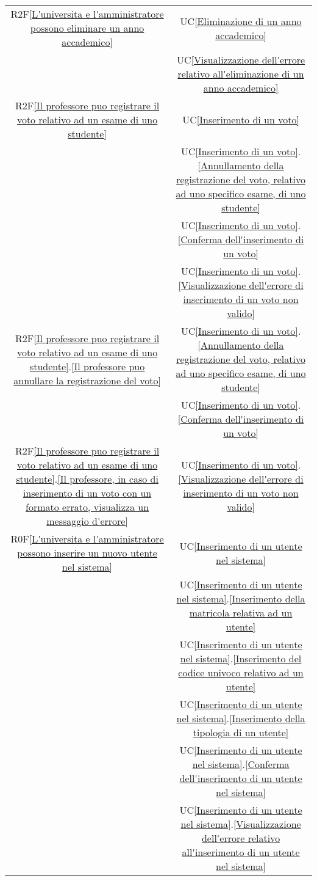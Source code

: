 \begin{longtable}{|c|c|}
\hline
R2F\ref{L'universita e l'amministratore possono eliminare un anno accademico} & UC\ref{Eliminazione di un anno accademico}\\
& UC\ref{Visualizzazione dell'errore relativo all'eliminazione di un anno accademico}\\
\hline
R2F\ref{Il professore puo registrare il voto relativo ad un esame di uno studente} 
& UC\ref{Inserimento di un voto} \\
& UC\ref{Inserimento di un voto}.\ref{Annullamento della registrazione del voto, relativo ad uno specifico esame, di uno studente}\\
& UC\ref{Inserimento di un voto}.\ref{Conferma dell'inserimento di un voto}\\
& UC\ref{Inserimento di un voto}.\ref{Visualizzazione dell'errore di inserimento di un voto non valido}\\
\hline
R2F\ref{Il professore puo registrare il voto relativo ad un esame di uno studente}.\ref{Il professore puo annullare la registrazione del voto} & UC\ref{Inserimento di un voto}.\ref{Annullamento della registrazione del voto, relativo ad uno specifico esame, di uno studente}\\
& UC\ref{Inserimento di un voto}.\ref{Conferma dell'inserimento di un voto}\\
\hline
R2F\ref{Il professore puo registrare il voto relativo ad un esame di uno studente}.\ref{Il professore, in caso di inserimento di un voto con un formato errato, visualizza un messaggio d'errore} & UC\ref{Inserimento di un voto}.\ref{Visualizzazione dell'errore di inserimento di un voto non valido}\\
\hline
R0F\ref{L'universita e l'amministratore possono inserire un nuovo utente nel sistema} & UC\ref{Inserimento di un utente nel sistema}\\
& UC\ref{Inserimento di un utente nel sistema}.\ref{Inserimento della matricola relativa ad un utente}\\
& UC\ref{Inserimento di un utente nel sistema}.\ref{Inserimento del codice univoco relativo ad un utente}\\
& UC\ref{Inserimento di un utente nel sistema}.\ref{Inserimento della tipologia di un utente}\\
& UC\ref{Inserimento di un utente nel sistema}.\ref{Conferma dell'inserimento di un utente nel sistema}\\
& UC\ref{Inserimento di un utente nel sistema}.\ref{Visualizzazione dell'errore relativo all'inserimento di un utente nel sistema}\\

\end{longtable}
